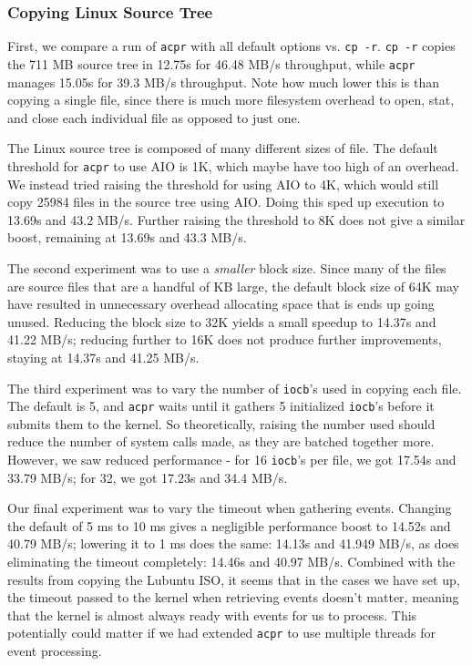 \documentclass[11pt]{article}
\begin{document}
\subsubsection{Copying Linux Source Tree}
First, we compare a run of \texttt{acpr} with all default options vs. \texttt{cp -r}. \texttt{cp -r} copies the 711 MB source tree in 12.75s for 46.48 MB/s throughput, while \texttt{acpr} manages 15.05s for 39.3 MB/s throughput. Note how much lower this is than copying a single file, since there is much more filesystem overhead to open, stat, and close each individual file as opposed to just one. 

The Linux source tree is composed of many different sizes of file. The default threshold for \texttt{acpr} to use AIO is 1K, which maybe have too high of an overhead. We instead tried raising the threshold for using AIO to 4K, which would still copy 25984 files in the source tree using AIO. Doing this sped up execution to 13.69s and 43.2 MB/s. Further raising the threshold to 8K does not give a similar boost, remaining at 13.69s and 43.3 MB/s.

The second experiment was to use a \textit{smaller} block size. Since many of the files are source files that are a handful of KB large, the default block size of 64K may have resulted in unnecessary overhead allocating space that is ends up going unused. Reducing the block size to 32K yields a small speedup to 14.37s and 41.22 MB/s; reducing further to 16K does not produce further improvements, staying at 14.37s and 41.25 MB/s.

The third experiment was to vary the number of \texttt{iocb}'s used in copying each file. The default is 5, and \texttt{acpr} waits until it gathers 5 initialized \texttt{iocb}'s before it submits them to the kernel. So theoretically, raising the number used should reduce the number of system calls made, as they are batched together more. However, we saw reduced performance - for 16 \texttt{iocb}'s per file, we got 17.54s and 33.79 MB/s; for 32, we got 17.23s and 34.4 MB/s.

Our final experiment was to vary the timeout when gathering events. Changing the default of 5 ms to 10 ms gives a negligible performance boost to 14.52s and 40.79 MB/s; lowering it to 1 ms does the same: 14.13s and 41.949 MB/s, as does eliminating the timeout completely: 14.46s and 40.97 MB/s. Combined with the results from copying the Lubuntu ISO, it seems that in the cases we have set up, the timeout passed to the kernel when retrieving events doesn't matter, meaning that the kernel is almost always ready with events for us to process. This potentially could matter if we had extended \texttt{acpr} to use multiple threads for event processing.
\end{document}

